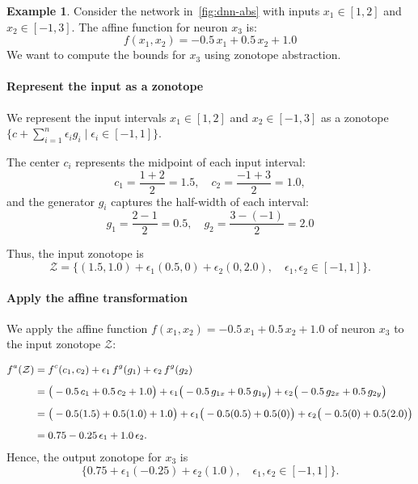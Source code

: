 \documentclass[oneside,11pt,dvipsnames]{book}
\numberwithin{equation}{section}
\theoremstyle{definition}
\newtheorem{example}{Example}[section]
\theoremstyle{remark}
\begin{document}
\begin{example}\label{ex:zonotope_linear_example}
Consider the network in~\autoref{fig:dnn-abs} with inputs \(x_1 \in [1, 2]\) and \(x_2 \in [-1, 3]\).
The affine function for neuron \(x_3\) is:
\[
f(x_1, x_2) = -0.5\,x_1 + 0.5\,x_2 + 1.0
\]
We want to compute the bounds for \(x_3\) using zonotope abstraction.
\paragraph{Represent the input as a zonotope}
We represent the input intervals \(x_1 \in [1, 2]\) and \(x_2 \in [-1, 3]\) as a zonotope $\{ c + \sum_{i=1}^{n} \epsilon_i g_i \mid \epsilon_i \in [-1,1] \}$.

The center $c_i$ represents the midpoint of each input interval:
\[
c_1 = \frac{1 + 2}{2} = 1.5, \quad c_2 = \frac{-1 + 3}{2} = 1.0,
\]
and the generator \(g_i\) captures the half-width of each interval:
\[
g_1 = \frac{2 - 1}{2} = 0.5, \quad g_2 = \frac{3 - (-1)}{2} = 2.0
\]


Thus, the input zonotope is
{\small
\[
\mathcal{Z} = \{(1.5, 1.0) + \epsilon_1(0.5, 0) + \epsilon_2(0, 2.0), \quad \epsilon_1, \epsilon_2 \in [-1,1]\}.
\]
}

\paragraph{Apply the affine transformation} We apply the affine function \(f(x_1, x_2) = -0.5\,x_1 + 0.5\,x_2 + 1.0\) of neuron \(x_3\)
to the input zonotope $\mathcal{Z}$:

\begin{equation}
\small
\begin{aligned}
f^a(\mathcal{Z})
  &= f^c(c_1, c_2)
     + \epsilon_1\, f^g(g_1)
     + \epsilon_2\, f^g(g_2) \\[4pt]
  &= \big(-0.5\,c_1 + 0.5\,c_2 + 1.0\big)
     + \epsilon_1\big(-0.5\,g_{1x} + 0.5\,g_{1y}\big)
     + \epsilon_2\big(-0.5\,g_{2x} + 0.5\,g_{2y}\big) \\[4pt]
  &= \big(-0.5(1.5) + 0.5(1.0) + 1.0\big)
     + \epsilon_1\big(-0.5(0.5) + 0.5(0)\big)
     + \epsilon_2\big(-0.5(0) + 0.5(2.0)\big) \\[4pt]
  &= 0.75 - 0.25\,\epsilon_1 + 1.0\,\epsilon_2.
\end{aligned}
\end{equation}
Hence, the output zonotope for \(x_3\) is
{\small
\[
\{0.75 + \epsilon_1(-0.25) + \epsilon_2(1.0), \quad \epsilon_1, \epsilon_2 \in [-1,1]\}.
\]
}

\end{example}
\end{document}
